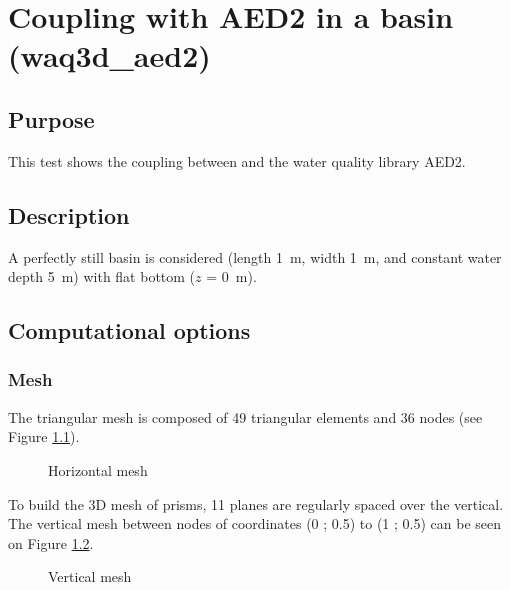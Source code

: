 \chapter{Coupling  with AED2 in a basin (waq3d\_aed2)}
%
%
\section{Purpose}
%
This test shows the coupling between  and the water quality library AED2.
%
\section{Description}
%
A perfectly still basin is considered (length 1~m, width 1~m, and constant water
depth 5~m) with flat bottom ($z$ = 0~m).
%
\section{Computational options}
%
\subsection{Mesh}
%
The triangular mesh is composed of 49 triangular elements and 36 nodes
(see Figure \ref{fig:waq3d_aed2:mesh}).

\begin{figure}[H]
 \centering
\caption{Horizontal mesh}
 \label{fig:waq3d_aed2:mesh}
\end{figure}

To build the 3D mesh of prisms, 11 planes are regularly spaced over the vertical.
The vertical mesh between nodes of coordinates (0 ; 0.5) to (1 ; 0.5) can be seen
on Figure \ref{fig:waq3d_aed2:mesh_section}.

\begin{figure}[H]
 \centering
\caption{Vertical mesh}
 \label{fig:waq3d_aed2:mesh_section}
\end{figure}

